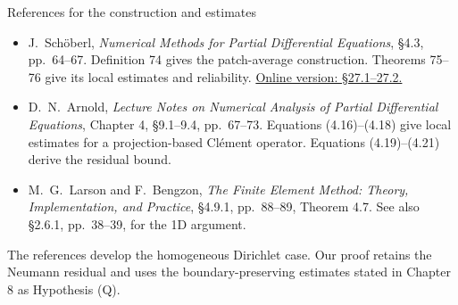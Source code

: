 \documentclass[11pt,aspectratio=169]{beamer}
\begin{document}
\begin{frame}{References for the construction and estimates}
\begin{itemize}
 \item J.~Sch\"oberl, \emph{Numerical Methods for Partial Differential
 Equations}, \S4.3, pp.~64--67. Definition 74 gives the patch-average
 construction. Theorems 75--76 give its local estimates and reliability.
 \href{https://jschoeberl.github.io/iFEM/aposteriori/residualEE.html}{Online version: \S27.1--27.2.}
 \item D.~N.~Arnold, \emph{Lecture Notes on Numerical Analysis of Partial
 Differential Equations}, Chapter 4, \S9.1--9.4, pp.~67--73.
 Equations (4.16)--(4.18) give local estimates for a projection-based
 Cl\'{e}ment operator. Equations (4.19)--(4.21) derive the residual bound.
 \item M.~G.~Larson and F.~Bengzon, \emph{The Finite Element Method:
 Theory, Implementation, and Practice}, \S4.9.1, pp.~88--89,
 Theorem 4.7. See also \S2.6.1, pp.~38--39, for the 1D argument.
\end{itemize}
The references develop the homogeneous Dirichlet case. Our proof retains
the Neumann residual and uses the boundary-preserving estimates stated in
Chapter 8 as Hypothesis (Q).
\end{frame}
\end{document}
